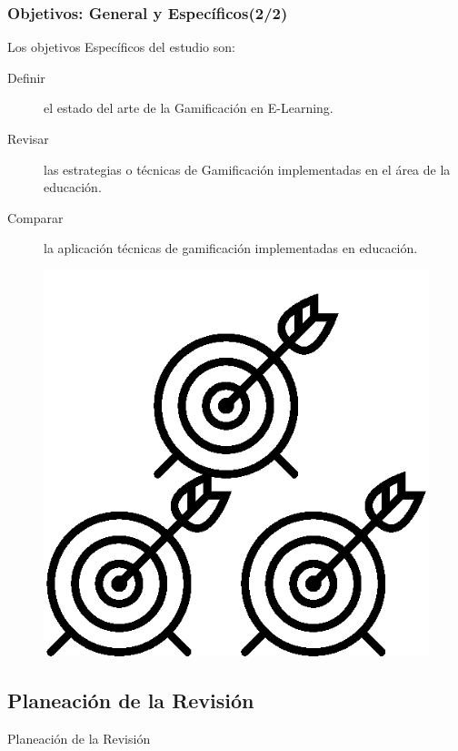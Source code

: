\documentclass{beamer}
\begin{document}
\begin{frame}
    \frametitle{Objetivos: General y Específicos(2/2)}
    Los objetivos Específicos del estudio son:
    \begin{description}
	    \item[Definir] el estado del arte de la Gamificación en E-Learning.
        	\item[Revisar] las estrategias o técnicas de Gamificación implementadas en el área de la educación.
        	\item[Comparar] la aplicación técnicas de gamificación implementadas en educación.
    \end{description}
	\begin{figure}
		\begin{center}
			\includegraphics[scale=0.1]{images/2icons/tarjet2.png}
			\label{student}
		\end{center}
	\end{figure}
\end{frame}

\subsection{Planeación de la Revisión}
\begin{frame}
\Huge{\centerline{Planeación de la Revisión}}
\end{frame}
\end{document}
